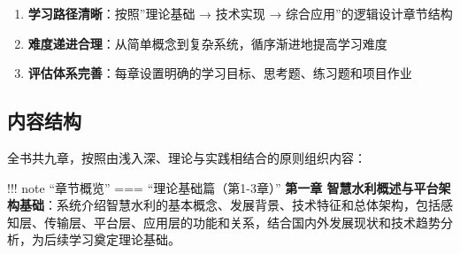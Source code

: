\begin{enumerate}
\def\labelenumi{\arabic{enumi}.}
\setcounter{enumi}{9}
\tightlist
\item
  \textbf{学习路径清晰}：按照''理论基础 → 技术实现 → 综合应用''的逻辑设计章节结构
\item
  \textbf{难度递进合理}：从简单概念到复杂系统，循序渐进地提高学习难度
\item
  \textbf{评估体系完善}：每章设置明确的学习目标、思考题、练习题和项目作业
\end{enumerate}

\subsection{内容结构}\label{ux5185ux5bb9ux7ed3ux6784}

全书共九章，按照由浅入深、理论与实践相结合的原则组织内容：

!!! note ``章节概览'' === ``理论基础篇（第1-3章）'' \textbf{第一章 智慧水利概述与平台架构基础}：系统介绍智慧水利的基本概念、发展背景、技术特征和总体架构，包括感知层、传输层、平台层、应用层的功能和关系，结合国内外发展现状和技术趋势分析，为后续学习奠定理论基础。

